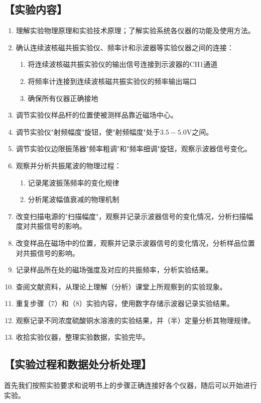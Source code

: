 \documentclass[12pt,a4paper,UTF8]{ctexart}
\begin{document}
\subsection*{【实验内容】}
\begin{enumerate}[(1)]
    \item 理解实验物理原理和实验技术原理；了解实验系统各仪器的功能及使用方法。
    \item 确认连续波核磁共振实验仪、频率计和示波器等实验仪器之间的连接：
    \begin{enumerate}[a]
        \item 将连续波核磁共振实验仪的输出信号连接到示波器的CH1通道
        \item 将频率计连接到连续波核磁共振实验仪的频率输出端口
        \item 确保所有仪器正确接地
    \end{enumerate}
    \item 调节实验仪样品杆的位置使被测样品靠近磁场中心。
    \item 调节实验仪"射频幅度"旋钮，使"射频幅度"处于$3.5-5.0\mathrm{V}$之间。
    \item 调节实验仪边限振荡器"频率粗调"和"频率细调"旋钮，观察示波器信号变化。
    \item 观察并分析共振尾波的物理过程：
    \begin{enumerate}[a]
        \item 记录尾波振荡频率的变化规律
        \item 分析尾波幅值衰减的物理机制
    \end{enumerate}
    \item 改变扫描电源的"扫描幅度"，观察并记录示波器信号的变化情况，分析扫描幅度对共振信号的影响。
    \item 改变样品在磁场中的位置，观察并记录示波器信号的变化情况，分析样品位置对共振信号的影响。
    \item 记录样品所在处的磁场强度及对应的共振频率，分析实验结果。
    \item 查阅文献资料，从理论上理解（分析）课堂上所观察到的实验现象。
    \item 重复步骤（7）和（8）实验内容，使用数字存储示波器记录实验结果。
    \item 观察记录不同浓度硫酸铜水溶液的实验结果，并（半）定量分析其物理规律。
    \item 收拾实验仪器，整理实验数据，实验完毕。
\end{enumerate}

\subsection*{【实验过程和数据处分析处理】}
首先我们按照实验要求和说明书上的步骤正确连接好各个仪器，随后可以开始进行实验。
\end{document}
